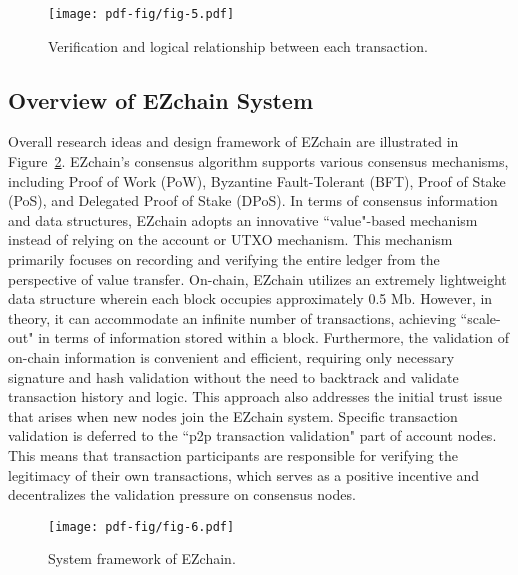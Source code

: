 \documentclass[conference]{IEEEtran}
\begin{document}
\begin{figure}[htp!]
    \centering
    \texttt{[image: pdf-fig/fig-5.pdf]}
    \caption{Verification and logical relationship between each transaction.}
    \label{fig:txn ver logical}
\end{figure}

\subsection{Overview of EZchain System}
\label{subsec:Overview of EZchain System}

Overall research ideas and design framework of EZchain are illustrated in Figure~\ref{fig:EZchain system framework}. EZchain's consensus algorithm supports various consensus mechanisms, including Proof of Work (PoW), Byzantine Fault-Tolerant (BFT), Proof of Stake (PoS), and Delegated Proof of Stake (DPoS). In terms of consensus information and data structures, EZchain adopts an innovative ``value"-based mechanism instead of relying on the account or UTXO mechanism. This mechanism primarily focuses on recording and verifying the entire ledger from the perspective of value transfer. On-chain, EZchain utilizes an extremely lightweight data structure wherein each block occupies approximately 0.5 Mb. However, in theory, it can accommodate an infinite number of transactions, achieving ``scale-out" in terms of information stored within a block. Furthermore, the validation of on-chain information is convenient and efficient, requiring only necessary signature and hash validation without the need to backtrack and validate transaction history and logic. This approach also addresses the initial trust issue that arises when new nodes join the EZchain system. Specific transaction validation is deferred to the ``p2p transaction validation" part of account nodes. This means that transaction participants are responsible for verifying the legitimacy of their own transactions, which serves as a positive incentive and decentralizes the validation pressure on consensus nodes.

\begin{figure}[h]
    \centering
    \texttt{[image: pdf-fig/fig-6.pdf]}
    \caption{System framework of EZchain.}
    \label{fig:EZchain system framework}
\end{figure}
\end{document}
